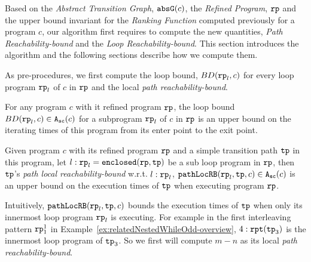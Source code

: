 Based on the \emph{Abstract Transition Graph}, $\mathtt{abs}{\mathtt{G}}(c)$, the \emph{Refined Program}, $\mathtt{rp}$ and the upper bound invariant for the \emph{Ranking Function} computed previously for a program $c$, our algorithm first requires to compute the new quantities, \emph{Path Reachability-bound} and the \emph{Loop Reachability-bound}. This section introduces the algorithm and the following sections describe how we compute them.

As pre-procedures, we first compute the loop bound, $BD(\mathtt{rp}_l, c)$ for every loop program $\mathtt{rp}_l$ of $c$ in $\mathtt{rp}$ and the local \emph{path reachability-bound}.
\begin{defn}
  For any program $c$ with it refined program $\mathtt{rp}$,
  the loop bound $BD(\mathtt{rp}_l, c) \in {\ensuremath{\mathtt{A_{sc}}}}(c)$ for a subprogram $\mathtt{rp}_l$ of $c$ in $\mathtt{rp}$ is an upper bound on the iterating times of this program from its enter point to the exit point.
\end{defn}
% 
\begin{defn}
  Given program $c$ with its refined program $\mathtt{rp}$ and a simple transition path $\mathtt{tp}$ in this program, 
  let $l: \mathtt{rp}_l = \mathtt{enclosed}(\mathtt{rp}, \mathtt{tp})$ be a sub loop program in $\mathtt{rp}$,
  then $\mathtt{tp}$'s \emph{path local reachability-bound} w.r.t. $l: \mathtt{rp}_l$,  $\mathtt{pathLocRB}(\mathtt{rp}_l, \mathtt{tp}, c) \in {\ensuremath{\mathtt{A_{sc}}}}(c)$
  is an upper bound on the execution times of $\mathtt{tp}$ when executing program $\mathtt{rp}$.
\end{defn}
Intuitively,
$\mathtt{pathLocRB}(\mathtt{rp}_l, \mathtt{tp}, c)$ bounds the execution times of $\mathtt{tp}$ when only its innermost loop program $\mathtt{rp}_l$ is executing.
For example in the first interleaving pattern $\mathtt{rp}_1^1$ in Example~\ref{ex:relatedNestedWhileOdd-overview}, 
$4:\mathtt{rpt}(\mathtt{tp}_3)$ is the innermost loop program of $\mathtt{tp}_3$.
So we first will compute $m - n$ as its local \emph{path reachability-bound}.

